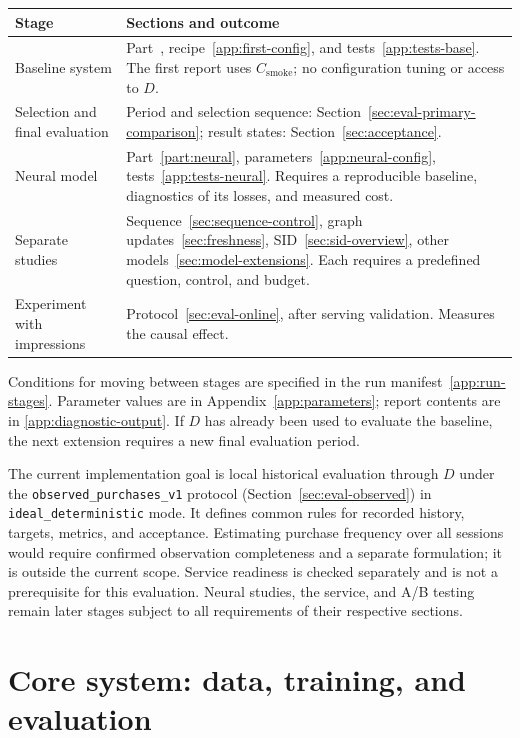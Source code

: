 \documentclass[12pt,a4paper]{article}
\newcommand{\code}[1]{{\ttfamily\small\nolinkurl{#1}}}
\theoremstyle{plainru}
\begin{document}
\begin{longtable}{L{0.22\textwidth}L{0.69\textwidth}}
\toprule Stage & Sections and outcome \\\midrule\endhead
Baseline system & Part~\ref{part:core}, recipe~\ref{app:first-config},
and tests~\ref{app:tests-base}. The first report uses
$C_{\mathrm{smoke}}$; no configuration tuning or access to $D$. \\
Selection and final evaluation & Period and selection sequence:
Section~\ref{sec:eval-primary-comparison}; result states:
Section~\ref{sec:acceptance}. \\
Neural model & Part~\ref{part:neural}, parameters~\ref{app:neural-config},
tests~\ref{app:tests-neural}. Requires a reproducible baseline,
diagnostics of its losses, and measured cost. \\
Separate studies & Sequence~\ref{sec:sequence-control},
graph updates~\ref{sec:freshness}, SID~\ref{sec:sid-overview},
other models~\ref{sec:model-extensions}. Each requires a predefined
question, control, and budget. \\
Experiment with impressions & Protocol~\ref{sec:eval-online},
after serving validation. Measures the causal effect. \\
\bottomrule
\end{longtable}

Conditions for moving between stages are specified in the
run manifest~\ref{app:run-stages}. Parameter values are in
Appendix~\ref{app:parameters}; report contents are in
\ref{app:diagnostic-output}. If $D$ has already been used to evaluate the baseline,
the next extension requires a new final evaluation period.

The current implementation goal is local historical evaluation through $D$
under the \code{observed_purchases_v1} protocol
(Section~\ref{sec:eval-observed}) in \code{ideal_deterministic} mode.
It defines common rules for recorded history, targets, metrics, and acceptance.
Estimating purchase frequency over all sessions would require confirmed
observation completeness and a separate formulation; it is outside the current scope.
Service readiness is checked
separately and is not a prerequisite for this evaluation. Neural studies,
the service, and A/B testing remain later stages subject to all requirements
of their respective sections.

\clearpage
\begingroup
\small
\setlength{\parskip}{0.1\baselineskip}
\tableofcontents
\endgroup
\clearpage

\part{Core system: data, training, and evaluation}\label{part:core}
\end{document}
